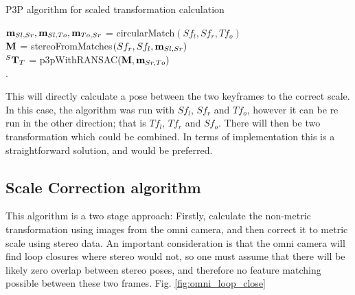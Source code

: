 \begin{algorithm}[h!]
 \caption{P3P algorithm for scaled transformation calculation}
 $\mathbf m_{Sl,Sr},\mathbf m_{Sl,To},\mathbf m_{To,Sr}$ = circularMatch$(Sf_{l}, Sf_r, Tf_o)$ \\
\vspace{0.4em}
 $\mathbf{M}$ = stereoFromMatches$(Sf_r, Sf_l, \mathbf m_{Sl, Sr})$ \\
\vspace{0.4em}
 $^S \mathbf T _T$ = p3pWithRANSAC$(\mathbf{M}, \mathbf{m}_{Sr,To})$ \\
\vspace{0.4em}
. 
\end{algorithm}


This will directly calculate a pose between the two keyframes to the correct scale.  In this case, the algorithm was run with $Sf_l$, $Sf_r$ and $Tf_o$, however it can be re run in the other direction; that is $Tf_l$, $Tf_r$ and $Sf_o$.  There will then be two transformation which could be combined.  In terms of implementation this is a straightforward solution, and would be preferred.  

\subsection{Scale Correction algorithm}

This algorithm is a two stage approach: Firstly, calculate the non-metric transformation using images from the omni camera, and then correct it to metric scale using stereo data.  An important consideration is that the omni camera will find loop closures where stereo would not, so one must assume that there will be likely zero overlap between stereo poses, and therefore no feature matching possible between these two frames. Fig. \ref{fig:omni_loop_close}

